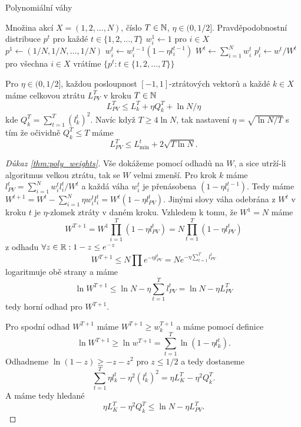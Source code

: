 
\begin{algorithm}
    \algrenewcommand{}
    \algrenewcommand{}
    \caption{Polynomiální váhy}
    \label{alg:poly_weights}
    \begin{algorithmic}[1]
        \Require  Množina akcí $X =(1,2,\dots,N)$, číslo $T \in \mathbb{N}$, $\eta \in (0,1/2]$.  
        \Ensure Pravděpodobnostní distribuce $p^t$ pro každé $t \in \{1,2,\dots, T\}$
        \State $w^1_i \leftarrow 1$ pro $i \in X$
        \State $p^1 \leftarrow (1/N,1/N,\dots,1/N)$
            \State $w^t_i \leftarrow w^{t-1}_i (1-\eta l^{t-1}_i)$
            \State $W^t \leftarrow \sum^N_{i=1} w^t_i$
            \State $p^t_i \leftarrow w^t/W^t$ pro všechna $i \in X$ 
        \EndFor
        \State vrátíme $\{p^t: t\in \{1,2,\dots,T\}\}$
    \end{algorithmic}
\end{algorithm}

\begin{theorem}
\label{thm:poly_weights}
Pro $\eta \in (0,1/2]$, každou posloupnost $[-1,1]$-ztrátových vektorů a každé $k \in X$ máme celkovou ztrátu $L^T_{PV}$ v kroku $T \in \mathbb{N}$ 
\[
    L^T_{PV} \leq L^T_{k} + \eta Q^T_k + \ln N / \eta
\]
kde $Q^T_k = \sum^T_{t =1 } (l^t_k)^2$. 
Navíc když $T \geq 4\ln N$, tak nastavení $\eta = \sqrt{\ln N/T}$ s tím že očividně $Q^T_k \leq T$ máme 
\[
    L^T_{PV} \leq L^t_{\min} + 2\sqrt{T \ln N}. 
\]
\end{theorem}

\begin{proof}[Důkaz \ref{thm:poly_weights}]
   Vše dokážeme pomocí odhadů na $W$, a sice utrží-li algoritmus velkou ztrátu, tak se $W$ velmi zmenší. 
    Pro krok $k$ máme $l^t_{PV} = \sum^N_{i=1} w^t_i l^t_i /W^t$ a každá váha $w^t_i$ je přenásobena $(1-\eta l^{t-1}_i)$. 
    Tedy máme $W^{t+1} = W^t - \sum_{i=1}^N \eta w^t_i l^t_i = W^t(1-\eta l^t_{PV})$. 
    Jinými slovy váha odebrána z $W^t$ v kroku $t$ je $\eta$-zlomek ztráty v daném kroku. 
    Vzhledem k tomu, že $W^1 = N$ máme 
    $$ 
    W^{T+1} = W^1 \prod^T_{i=1}(1- \eta l^t_{PV}) = N \prod^T_{t=1}(1- \eta l^t_{PV})
    $$
    z odhadu $\forall z \in \mathbb{R}: 1-z \leq e^{-z}$
    \[
        W^{T+1} \leq N \prod e^{-\eta l^t_{PV}} = Ne^{-\eta \sum^T_{t=1} l^t_{PV}}
    \]
    logaritmuje obě strany a máme 
    \[
        \ln W^{T+1} \leq \ln N - \eta \sum^T_{t=1} l^t_{PV} = \ln N - \eta L^T_{PV} 
    \]
    tedy horní odhad pro $W^{T+1}$.

    Pro spodní odhad $W^{T+1}$ máme $W^{T+1} \geq w_k^{T+1}$ a máme pomocí definice 
    \[
        \ln W^{T+1} \geq \ln w^{T+1} = \sum^{T}_{t=1} \ln(1-\eta l_k^t). 
    \]
    Odhadneme $\ln (1-z) \geq -z-z^2$ pro $z \leq 1/2$ a tedy dostaneme
    \[
        \sum^{T}_{t=1} \eta l^t_k - \eta^2 (l^t_k)^2 = \eta L^T_K - \eta^2 Q_k^T. 
    \]
    A máme tedy hledané
    $$
    \eta L^T_K - \eta^2 Q_k^T \leq \ln N - \eta L^T_{PV}. 
    $$
\end{proof}

